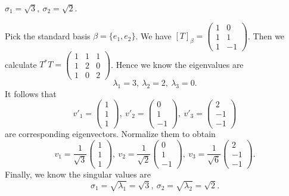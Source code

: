 \begin{Exercise}
\begin{enumerate}[(a)]
\begin{answer}
			$\sigma_1 = \sqrt{3},\ \sigma_2 = \sqrt{2}$.
		\end{answer}
		\begin{solution}
			Pick the standard basis $\beta = \{e_1, e_2\}$.
			We have $[T]_{\beta} = \begin{pmatrix}
			1 & 0 \\
			1 & 1 \\
			1 & -1
			\end{pmatrix}$.
			Then we calculate $T^* T = \begin{pmatrix}
			1 & 1 & 1 \\
			1 & 2 & 0 \\
			1 & 0 & 2
			\end{pmatrix}$.
			Hence we know the eigenvalues are
			$$
			\lambda_1 = 3,~ \lambda_2 = 2,~ \lambda_3 = 0.
			$$
			It follows that
			$$
			v'_1 = \begin{pmatrix}
			1 \\
			1 \\
			1
			\end{pmatrix},~ v'_2 = \begin{pmatrix}
			0 \\
			1 \\
			-1
			\end{pmatrix},~ v'_3 = \begin{pmatrix}
			2 \\
			-1 \\
			-1
			\end{pmatrix}
			$$
			are corresponding eigenvectors.
			Normalize them to obtain
			$$
			v_1 = \dfrac{1}{\sqrt{3}}\begin{pmatrix}
			1 \\
			1 \\
			1
			\end{pmatrix},~ v_2 = \dfrac{1}{\sqrt{2}}\begin{pmatrix}
			0 \\
			1 \\
			-1
			\end{pmatrix},~ v_3 = \dfrac{1}{\sqrt{6}}\begin{pmatrix}
			2 \\
			-1 \\
			-1
			\end{pmatrix}.
			$$
			Finally, we know the singular values are
			$$
			\sigma_1 = \sqrt{\lambda_1} = \sqrt{3},~ 
			\sigma_2 = \sqrt{\lambda_2} = \sqrt{2}.
			$$
		\end{solution}
	\end{enumerate}
\end{Exercise}